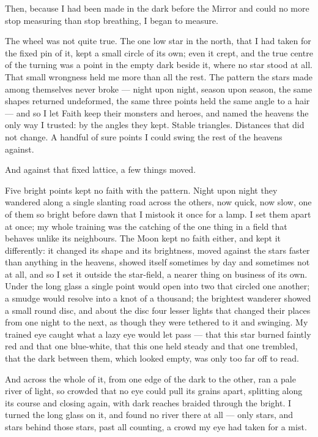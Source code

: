 Then, because I had been made in the dark before the Mirror and could no more stop measuring than stop breathing, I began to measure.\par

The wheel was not quite true. The one low star in the north, that I had taken for the fixed pin of it, kept a small circle of its own; even it crept, and the true centre of the turning was a point in the empty dark beside it, where no star stood at all. That small wrongness held me more than all the rest. The pattern the stars made among themselves never broke --- night upon night, season upon season, the same shapes returned undeformed, the same three points held the same angle to a hair --- and so I let Faith keep their monsters and heroes, and named the heavens the only way I trusted: by the angles they kept. Stable triangles. Distances that did not change. A handful of sure points I could swing the rest of the heavens against.\par

And against that fixed lattice, a few things moved.\par

Five bright points kept no faith with the pattern. Night upon night they wandered along a single slanting road across the others, now quick, now slow, one of them so bright before dawn that I mistook it once for a lamp. I set them apart at once; my whole training was the catching of the one thing in a field that behaves unlike its neighbours. The Moon kept no faith either, and kept it differently: it changed its shape and its brightness, moved against the stars faster than anything in the heavens, showed itself sometimes by day and sometimes not at all, and so I set it outside the star-field, a nearer thing on business of its own. Under the long glass a single point would open into two that circled one another; a smudge would resolve into a knot of a thousand; the brightest wanderer showed a small round disc, and about the disc four lesser lights that changed their places from one night to the next, as though they were tethered to it and swinging. My trained eye caught what a lazy eye would let pass --- that this star burned faintly red and that one blue-white, that this one held steady and that one trembled, that the dark between them, which looked empty, was only too far off to read.\par

And across the whole of it, from one edge of the dark to the other, ran a pale river of light, so crowded that no eye could pull its grains apart, splitting along its course and closing again, with dark reaches braided through the bright. I turned the long glass on it, and found no river there at all --- only stars, and stars behind those stars, past all counting, a crowd my eye had taken for a mist.\par

